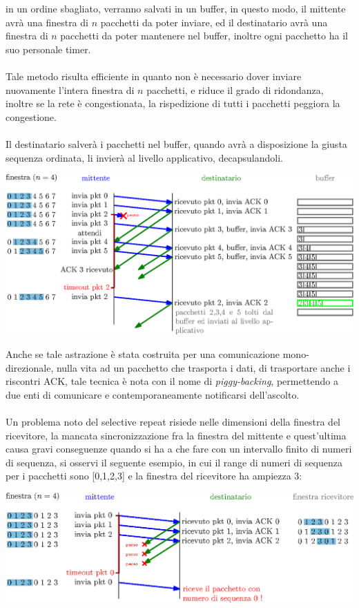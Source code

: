 \documentclass[12pt, letterpaper]{article}
\newcommand{\acc}{\\\hphantom{}\\}
\begin{document}
in un ordine sbagliato, verranno salvati in un buffer, in questo modo, il mittente avrà una finestra di $n$ pacchetti 
da poter inviare, ed il destinatario avrà una finestra di $n$ pacchetti da poter mantenere nel buffer, inoltre ogni 
pacchetto ha il suo personale timer.\acc 
Tale metodo risulta efficiente in quanto non è necessario dover inviare nuovamente l'intera finestra di $n$ pacchetti, 
e riduce il grado di ridondanza, inoltre se la rete è congestionata, la rispedizione di tutti i pacchetti 
peggiora la congestione. \acc 
Il destinatario salverà i pacchetti nel buffer, quando avrà a disposizione la giusta sequenza ordinata, li invierà 
al livello applicativo, decapsulandoli.\begin{center}
    \includegraphics[width=1\textwidth ]{images/selectiveRepeat.eps}
\end{center} 
Anche se tale astrazione è stata costruita per una comunicazione mono-direzionale, nulla vita ad un pacchetto che 
trasporta i dati, di trasportare anche i riscontri ACK, tale tecnica è nota con il nome di \textit{piggy-backing}, 
permettendo a due enti di comunicare e contemporaneamente notificarsi dell'ascolto.\acc 
Un problema noto del selective repeat risiede nelle dimensioni della finestra del ricevitore, la mancata sincronizzazione 
fra la finestra del mittente e quest'ultima causa gravi conseguenze quando si ha a che fare con un intervallo finito 
di numeri di sequenza, si osservi il seguente esempio, in cui il range di numeri di sequenza per i 
pacchetti sono [0,1,2,3] e la finestra del ricevitore ha ampiezza 3:\begin{center}
    \includegraphics[width=\textwidth ]{images/ErroreSelectiveRepeat.eps}
\end{center} 
\end{document}
